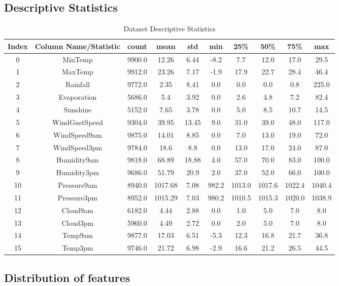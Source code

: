 \documentclass{article}%
\begin{document}
%
\subsection{Descriptive Statistics}%
\label{subsec:DescriptiveStatistics}%


\begin{table}[h!]%
\caption{Dataset Descriptive Statistics}%
\vspace{0.2cm}%
\centering%
\begin{tabular}{|c||c||c||c||c||c||c||c||c||c|}%
\hline%
Index&Column Name/Statistic&count&mean&std&min&25\%&50\%&75\%&max\\%
\hline%
0&MinTemp&9900.0&12.26&6.44&{-}8.2&7.7&12.0&17.0&29.5\\%
1&MaxTemp&9912.0&23.26&7.17&{-}1.9&17.9&22.7&28.4&46.4\\%
2&Rainfall&9772.0&2.35&8.41&0.0&0.0&0.0&0.8&225.0\\%
3&Evaporation&5686.0&5.4&3.92&0.0&2.6&4.8&7.2&82.4\\%
4&Sunshine&5152.0&7.65&3.78&0.0&5.0&8.5&10.7&14.5\\%
5&WindGustSpeed&9304.0&39.95&13.45&9.0&31.0&39.0&48.0&117.0\\%
6&WindSpeed9am&9875.0&14.01&8.85&0.0&7.0&13.0&19.0&72.0\\%
7&WindSpeed3pm&9784.0&18.6&8.8&0.0&13.0&17.0&24.0&87.0\\%
8&Humidity9am&9818.0&68.89&18.88&4.0&57.0&70.0&83.0&100.0\\%
9&Humidity3pm&9686.0&51.79&20.9&2.0&37.0&52.0&66.0&100.0\\%
10&Pressure9am&8940.0&1017.68&7.08&982.2&1013.0&1017.6&1022.4&1040.4\\%
11&Pressure3pm&8952.0&1015.29&7.03&980.2&1010.5&1015.3&1020.0&1038.9\\%
12&Cloud9am&6182.0&4.44&2.88&0.0&1.0&5.0&7.0&8.0\\%
13&Cloud3pm&5960.0&4.49&2.72&0.0&2.0&5.0&7.0&8.0\\%
14&Temp9am&9877.0&17.03&6.51&{-}5.3&12.3&16.8&21.7&36.8\\%
15&Temp3pm&9746.0&21.72&6.98&{-}2.9&16.6&21.2&26.5&44.5\\%
\hline%
\end{tabular}%
\end{table}

%
\newpage%
\subsection{Distribution of features}%
\label{subsec:Distributionoffeatures}%
\end{document}
